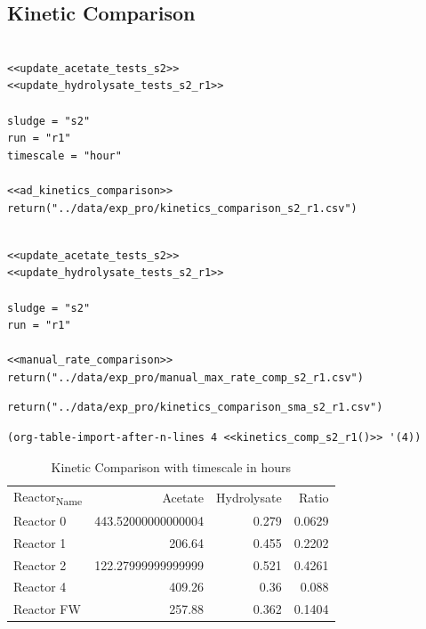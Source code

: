\documentclass[11pt]{article}
\begin{document}
\subsection{Kinetic Comparison}
\label{sec:org7f38ec3}
\begin{verbatim}

<<update_acetate_tests_s2>>
<<update_hydrolysate_tests_s2_r1>>

sludge = "s2"
run = "r1"
timescale = "hour"

<<ad_kinetics_comparison>>
return("../data/exp_pro/kinetics_comparison_s2_r1.csv")
\end{verbatim}

\begin{verbatim}

<<update_acetate_tests_s2>>
<<update_hydrolysate_tests_s2_r1>>

sludge = "s2"
run = "r1"

<<manual_rate_comparison>>
return("../data/exp_pro/manual_max_rate_comp_s2_r1.csv")

\end{verbatim}

\begin{verbatim}
return("../data/exp_pro/kinetics_comparison_sma_s2_r1.csv")
\end{verbatim}

\begin{verbatim}
(org-table-import-after-n-lines 4 <<kinetics_comp_s2_r1()>> '(4))
\end{verbatim}

\begin{table}[htbp]
\caption{Kinetic Comparison with timescale in hours}
\centering
\begin{tabular}{lrrr}
Reactor\textsubscript{Name} & Acetate & Hydrolysate & Ratio\\[0pt]
Reactor 0 & 443.52000000000004 & 0.279 & 0.0629\\[0pt]
Reactor 1 & 206.64 & 0.455 & 0.2202\\[0pt]
Reactor 2 & 122.27999999999999 & 0.521 & 0.4261\\[0pt]
Reactor 4 & 409.26 & 0.36 & 0.088\\[0pt]
Reactor FW & 257.88 & 0.362 & 0.1404\\[0pt]
\end{tabular}
\end{table}
\end{document}
